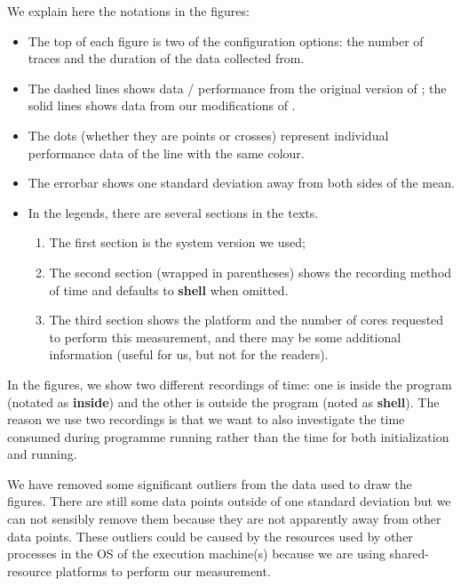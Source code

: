 We explain here the notations in the figures:
\begin{itemize}
	\item The top of each figure is two of the configuration options: the number of traces and the duration of the data collected from.
	\item The dashed lines shows data / performance from the original version of \dpy; the solid lines shows data from our modifications of \dpy.
	\item The dots (whether they are points or crosses) represent individual performance data of the line with the same colour.
	\item The errorbar shows one standard deviation away from both sides of the mean.
	\item In the legends, there are several sections in the texts.
	\begin{enumerate}
		\item The first section is the system version we used; 
		\item The second section (wrapped in parentheses) shows the recording method of time and defaults to \textbf{shell} when omitted.
		\item The third section shows the platform and the number of cores requested to perform this measurement, and there may be some additional information (useful for us, but not for the readers).
	\end{enumerate}
\end{itemize}

In the figures, we show two different recordings of time: one is inside the program (notated as \textbf{inside}) and the other is outside the program (noted as \textbf{shell}). The reason we use two recordings is that we want to also investigate the time consumed during programme running rather than the time for both initialization and running.

We have removed some significant outliers from the data used to draw the figures. There are still some data points outside of one standard deviation but we can not sensibly remove them because they are not apparently away from other data points. These outliers could be caused by the resources used by other processes in the OS of the execution machine(s) because we are using shared-resource platforms to perform our measurement.

